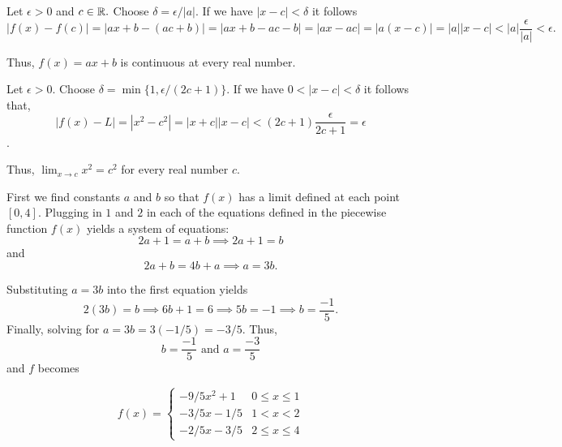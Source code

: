 \documentclass{report}
\begin{document}
\pagebreak
{}


\begin{myproof}
    Let $\epsilon >0$ and $c \in \RR.$ Choose $\delta = \epsilon/|a|.$ If we have $ |x-c|< \delta$ it follows $$ |f(x) - f(c)| = |ax +b - (ac+b)| = | ax + b -ac - b | = |ax -ac| = |a(x-c)| = |a||x-c|< |a|\frac{\epsilon}{|a|} < \epsilon.$$

Thus, $f(x)=a x+b$ is continuous at every real number.
\end{myproof}


\begin{myproof}
  Let $\epsilon > 0.$ Choose $\delta = \min\{1, \epsilon/(2c+1)\}$. If we have $0 < |x-c| < \delta$ it follows that, $$|f(x) - L| = |x^2 - c^2| = |x + c||x-c| < (2c+1)\frac{\epsilon}{2c+1} = \epsilon$$.

Thus, $\lim _{x \rightarrow c} x^2=c^2$ for every real number $c$.
\end{myproof}


\pagebreak
{}
\bigskip
\sol

First we find constants $a$ and $b$ so that $f(x)$ has a limit defined at each point $[0,4].$ Plugging in $1$ and $2$ in each of the equations defined in the piecewise function $f(x)$ yields a system of equations:$$ 2a +1 = a + b \implies 2a +1 = b$$
and $$2a +b = 4b + a \implies a = 3b.$$

Substituting $a = 3b$ into the first equation yields $$2(3b) = b \implies 6b + 1 =6 \implies 5b = -1 \implies b = \frac{-1}{5}.$$ Finally, solving for $a = 3b = 3 (-1/5) = -3/5.$ Thus, $$ b = \frac{-1}{5} \text { and } a = \frac{-3}{5} $$ and $f$ becomes


$$
f(x)=\left\{\begin{array}{cc}
-9/5 x^2+1 & 0 \leq x \leq 1 \\
-3/5 x - 1/5 & 1<x<2 \\
-2/5 x - 3/5 & 2 \leq x \leq 4
\end{array}\right.
$$
\pagebreak
\end{document}
